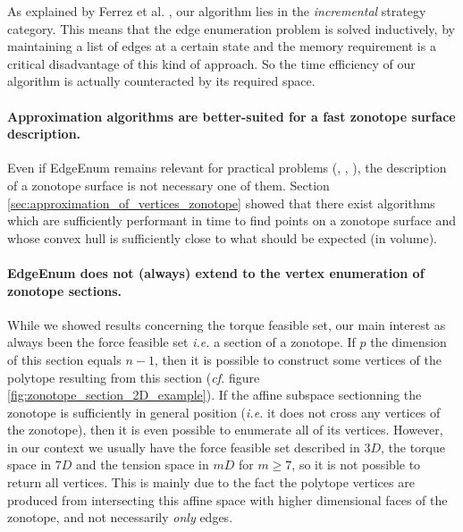 As explained by Ferrez et al. \cite{ferrezSolvingFixedRank2005a}, our algorithm lies in the \emph{incremental} strategy category. This means that the edge enumeration problem is solved inductively, by maintaining a list of edges at a certain state and the memory requirement is a critical disadvantage of this kind of approach. So the time efficiency of our algorithm is actually counteracted by its required space.

\paragraph*{Approximation algorithms are better-suited for a fast zonotope surface description.} Even if EdgeEnum remains relevant for practical problems (\cite{guCounterfactualIdentificationLatent2022}, \cite{fukudaZonotopeConstructionMinkowski2004a}, \cite{guibasZonotopesBoundingVolumes}), the description of a zonotope surface is not necessary one of them. Section \ref{sec:approximation_of_vertices_zonotope} showed that there exist algorithms which are sufficiently performant in time to find points on a zonotope surface and whose convex hull is sufficiently close to what should be expected (in volume).

\paragraph*{EdgeEnum does not (always) extend to the vertex enumeration of zonotope sections.} While we showed results concerning the torque feasible set, our main interest as always been the force feasible set \emph{i.e.} a section of a zonotope. If $p$ the dimension of this section equals $n-1$, then it is possible to construct some vertices of the polytope resulting from this section (\emph{cf.} figure \ref{fig:zonotope_section_2D_example}). If the affine subspace sectionning the zonotope is sufficiently in general position (\emph{i.e.} it does not cross any vertices of the zonotope), then it is even possible to enumerate all of its vertices. However, in our context we usually have the force feasible set described in $3D$, the torque space in $7D$ and the tension space in $mD$ for $m\geq 7$, so it is not possible to return all vertices. This is mainly due to the fact the polytope vertices are produced from intersecting this affine space with higher dimensional faces of the zonotope, and not necessarily \emph{only} edges.

